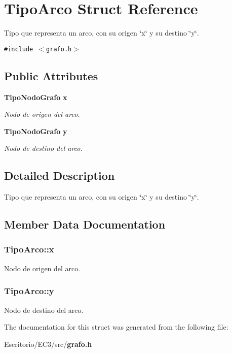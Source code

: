 \section{TipoArco Struct Reference}
\label{structTipoArco}
Tipo que representa un arco, con su origen \char`\"{}x\char`\"{} y su destino \char`\"{}y\char`\"{}.  


{\tt \#include $<$grafo.h$>$}

\subsection*{Public Attributes}
\begin{CompactItemize}
\item 
{\bf TipoNodoGrafo} {\bf x}
\begin{CompactList}\small\item\em Nodo de origen del arco. \item\end{CompactList}\item 
{\bf TipoNodoGrafo} {\bf y}
\begin{CompactList}\small\item\em Nodo de destino del arco. \item\end{CompactList}\end{CompactItemize}


\subsection{Detailed Description}
Tipo que representa un arco, con su origen \char`\"{}x\char`\"{} y su destino \char`\"{}y\char`\"{}. 



\subsection{Member Data Documentation}
\subsubsection{ {\bf TipoArco::x}}\label{structTipoArco_e8c5ce405fb4d5f3787fd6a0b0f39320}


Nodo de origen del arco. 

\subsubsection{ {\bf TipoArco::y}}\label{structTipoArco_2d2138f47d0cbefb0f8d4ad91952955a}


Nodo de destino del arco. 



The documentation for this struct was generated from the following file:\begin{CompactItemize}
\item 
Escritorio/EC3/src/{\bf grafo.h}\end{CompactItemize}
